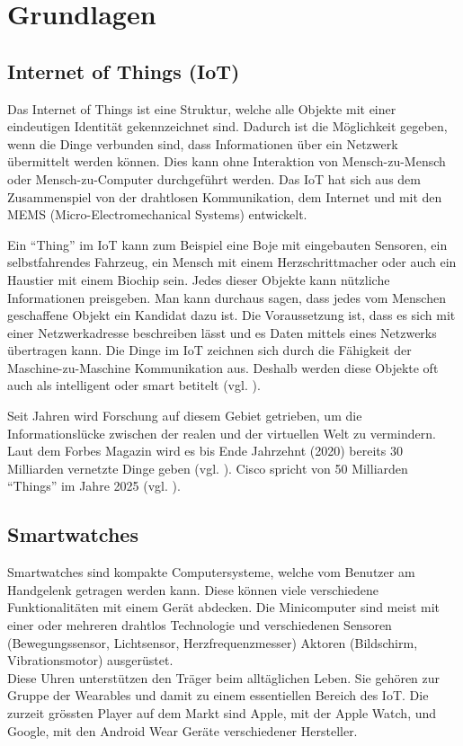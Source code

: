 \chapter{Grundlagen}
\section{Internet of Things (IoT)}
Das Internet of Things ist eine Struktur, welche alle Objekte mit einer eindeutigen Identität gekennzeichnet sind. Dadurch ist die Möglichkeit gegeben, wenn die Dinge verbunden sind, dass Informationen über ein Netzwerk übermittelt werden können. Dies kann ohne Interaktion von Mensch-zu-Mensch oder Mensch-zu-Computer durchgeführt werden. Das \gls{IoT} hat sich aus dem Zusammenspiel von der drahtlosen Kommunikation, dem Internet und mit den \gls{MEMS} (Micro-Electromechanical Systems) entwickelt.

Ein "`Thing"' im \gls{IoT} kann zum Beispiel eine Boje mit eingebauten Sensoren, ein selbstfahrendes Fahrzeug, ein Mensch mit einem Herzschrittmacher oder auch ein Haustier mit einem Biochip sein. Jedes dieser Objekte kann nützliche Informationen preisgeben. Man kann durchaus sagen, dass jedes vom Menschen geschaffene Objekt ein Kandidat dazu ist. Die Voraussetzung ist, dass es sich mit einer Netzwerkadresse beschreiben lässt und es Daten mittels eines Netzwerks übertragen kann. Die Dinge im \gls{IoT} zeichnen sich durch die Fähigkeit der Maschine-zu-Maschine Kommunikation aus. Deshalb werden diese Objekte oft auch als intelligent oder smart betitelt (vgl. \cite{mr:iotdef}).

Seit Jahren wird Forschung auf diesem Gebiet getrieben, um die Informationslücke zwischen der realen und der virtuellen Welt zu vermindern. Laut dem Forbes Magazin wird es bis Ende Jahrzehnt (2020) bereits 30 Milliarden vernetzte Dinge geben (vgl. \cite{mr:iotdef}). Cisco spricht von 50 Milliarden "`Things"' im Jahre 2025 (vgl. \cite{mk:iot}).

\section{Smartwatches}
Smartwatches sind kompakte Computersysteme, welche vom Benutzer am Handgelenk getragen werden kann. Diese können viele verschiedene Funktionalitäten mit einem Gerät abdecken. Die Minicomputer sind meist mit einer oder mehreren drahtlos Technologie und verschiedenen Sensoren (Bewegungssensor, Lichtsensor, Herzfrequenzmesser) Aktoren (Bildschirm, Vibrationsmotor) ausgerüstet.\\
Diese Uhren unterstützen den Träger beim alltäglichen Leben. Sie gehören zur Gruppe der Wearables und damit zu einem essentiellen Bereich des \gls{IoT}. Die zurzeit grössten Player auf dem Markt sind Apple, mit der Apple Watch, und Google, mit den Android Wear Geräte verschiedener Hersteller.

